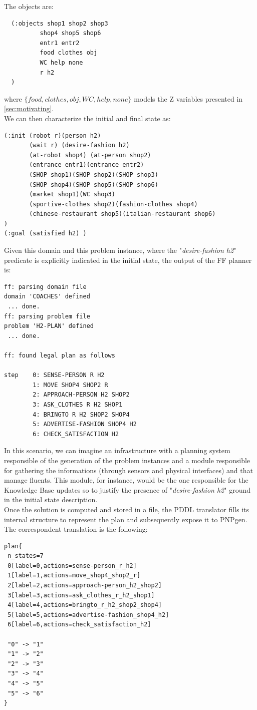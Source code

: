 \documentclass[pdftex,12pt,a4paper]{report}
\begin{document}
\noindent The objects are:
\begin{verbatim}
  (:objects shop1 shop2 shop3
          shop4 shop5 shop6
          entr1 entr2
          food clothes obj
          WC help none
          r h2
  )
\end{verbatim}
\noindent where $\{food, clothes, obj, WC, help, none\}$ models the Z variables presented in \ref{sec:motivating}.\\
\noindent We can then characterize the initial and final state as:
\begin{verbatim}
(:init (robot r)(person h2)
       (wait r) (desire-fashion h2)
	   (at-robot shop4) (at-person shop2)
       (entrance entr1)(entrance entr2)
       (SHOP shop1)(SHOP shop2)(SHOP shop3)
       (SHOP shop4)(SHOP shop5)(SHOP shop6)
       (market shop1)(WC shop3)
       (sportive-clothes shop2)(fashion-clothes shop4)
       (chinese-restaurant shop5)(italian-restaurant shop6)
)
(:goal (satisfied h2) )
\end{verbatim}
\noindent Given this domain and this problem instance, where the "\textit{desire-fashion h2}" predicate is explicitly indicated in the initial state, the output of the FF planner is:
\begin{verbatim}
ff: parsing domain file
domain 'COACHES' defined
 ... done.
ff: parsing problem file
problem 'H2-PLAN' defined
 ... done.    

ff: found legal plan as follows

step    0: SENSE-PERSON R H2
        1: MOVE SHOP4 SHOP2 R
        2: APPROACH-PERSON H2 SHOP2
        3: ASK_CLOTHES R H2 SHOP1
        4: BRINGTO R H2 SHOP2 SHOP4
        5: ADVERTISE-FASHION SHOP4 H2
        6: CHECK_SATISFACTION H2
\end{verbatim}
\noindent In this scenario, we can imagine an infrastructure with a planning system responsible of the generation of the problem instances and a module responsible for gathering the informations (through sensors and physical interfaces) and that manage fluents. This module, for instance, would be the one responsible for the Knowledge Base updates so to justify the presence of  "\textit{desire-fashion h2}" ground in the initial state description.\\

\noindent Once the solution is computed and stored in a file, the PDDL translator fills its internal structure to represent the plan and subsequently expose it to PNPgen. The correspondent translation is the following:

\begin{verbatim}
plan{ 
 n_states=7
 0[label=0,actions=sense-person_r_h2]
 1[label=1,actions=move_shop4_shop2_r]
 2[label=2,actions=approach-person_h2_shop2]
 3[label=3,actions=ask_clothes_r_h2_shop1]
 4[label=4,actions=bringto_r_h2_shop2_shop4]
 5[label=5,actions=advertise-fashion_shop4_h2]
 6[label=6,actions=check_satisfaction_h2]

 "0" -> "1"
 "1" -> "2"
 "2" -> "3"
 "3" -> "4"
 "4" -> "5"
 "5" -> "6"
}
\end{verbatim}
\end{document}
